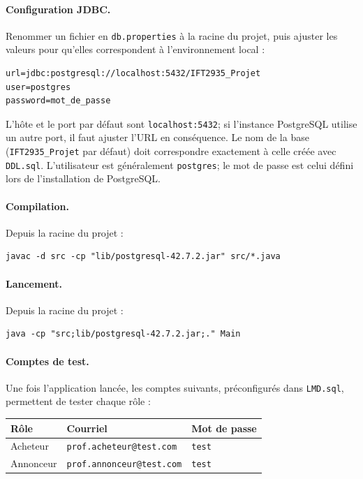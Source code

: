 \documentclass{article}
\theoremstyle{plain}
\theoremstyle{definition}
\begin{document}
\paragraph{Configuration JDBC.}
Renommer un fichier en \texttt{db.properties} à la racine du projet, puis ajuster les valeurs pour qu'elles correspondent à l'environnement local :
 
\begin{verbatim}
url=jdbc:postgresql://localhost:5432/IFT2935_Projet
user=postgres
password=mot_de_passe
\end{verbatim}
 
L'hôte et le port par défaut sont \texttt{localhost:5432}; si l'instance PostgreSQL utilise un autre port, il faut ajuster l'URL en conséquence. Le nom de la base (\texttt{IFT2935\_Projet} par défaut) doit correspondre exactement à celle créée avec \texttt{DDL.sql}. L'utilisateur est généralement \texttt{postgres}; le mot de passe est celui défini lors de l'installation de PostgreSQL.
 
\paragraph{Compilation.}
Depuis la racine du projet :
 
\begin{verbatim}
javac -d src -cp "lib/postgresql-42.7.2.jar" src/*.java
\end{verbatim}
 
\paragraph{Lancement.}
Depuis la racine du projet :
 
\begin{verbatim}
java -cp "src;lib/postgresql-42.7.2.jar;." Main
\end{verbatim}
 
\paragraph{Comptes de test.}
Une fois l'application lancée, les comptes suivants, préconfigurés dans \texttt{LMD.sql}, permettent de tester chaque rôle :
 
\begin{center}
\begin{tabular}{lll}
\textbf{Rôle} & \textbf{Courriel} & \textbf{Mot de passe} \\
\hline
Acheteur  & \texttt{prof.acheteur@test.com}  & \texttt{test} \\
Annonceur & \texttt{prof.annonceur@test.com} & \texttt{test} \\
\end{tabular}
\end{center}
\end{document}
